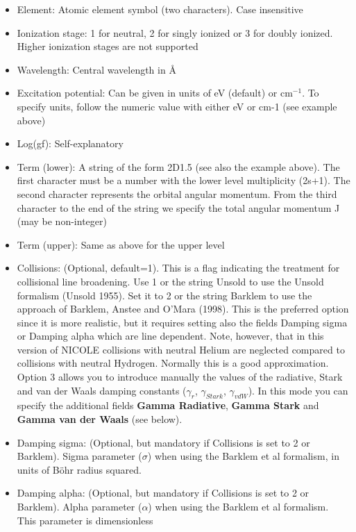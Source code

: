 \begin{itemize}
\item Element: Atomic element symbol (two characters). Case
  insensitive
\item Ionization stage: 1 for neutral, 2 for singly ionized or 3 for
  doubly ionized. Higher ionization stages are not supported
\item Wavelength: Central wavelength in \AA
\item Excitation potential: Can be given in units of eV (default) or
  cm$^{-1}$. To specify units, follow the numeric value with either eV
  or cm-1 (see example above)
\item Log(gf): Self-explanatory
\item Term (lower): A string of the form 2D1.5 (see also the example
  above). The first character must be a number with the lower level
  multiplicity (2s+1). The second character represents the orbital
  angular momentum. From the third character to the end of the string
  we specify the total angular momentum J (may be non-integer)
\item Term (upper): Same as above for the upper level
\item Collisions: (Optional, default=1). This is a flag indicating the
  treatment for collisional line broadening. Use 1 or the string
  Unsold to use the Unsold formalism (Unsold 1955). Set it to 2 or the
  string Barklem to use the approach of Barklem, Anstee and O'Mara
  (1998). This is the preferred option since it is more realistic, but
  it requires setting also the fields Damping sigma or Damping alpha
  which are line dependent. Note, however, that in this version of
  NICOLE collisions with neutral Helium are neglected compared to
  collisions with neutral Hydrogen. Normally this is a good
  approximation. Option 3 allows you to introduce manually the values
  of the radiative, Stark and van der Waals damping constants
  ($\gamma_r$, $\gamma_{Stark}$, $\gamma_{vdW}$). In this mode you can
  specify the additional fields {\bf Gamma Radiative}, {\bf Gamma
    Stark} and {\bf Gamma van der Waals} (see below). 
\item Damping sigma: (Optional, but mandatory if Collisions is set to
  2 or Barklem). Sigma parameter ($\sigma$) when using the
  Barklem et al formalism, in units of B\"ohr radius squared. 
\item Damping alpha: (Optional, but mandatory if Collisions is set to
  2 or Barklem). Alpha parameter ($\alpha$) when using the
  Barklem et al formalism. This parameter is dimensionless

\end{itemize}
